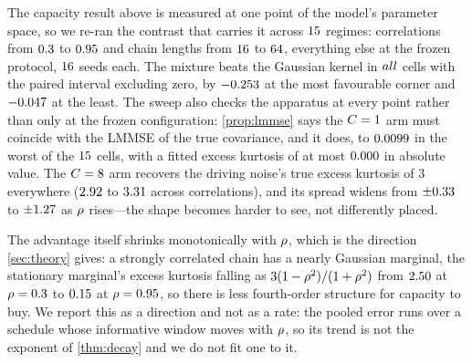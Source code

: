 The capacity result above is measured at one point of the model's parameter space, so we
re-ran the contrast that carries it across $15$ regimes: correlations from
$0.3$ to $0.95$ and chain lengths from $16$ to $64$, everything
else at the frozen protocol, $16$ seeds each. The mixture beats the Gaussian
kernel in $all$ cells with the paired interval excluding zero, by
$-0.253$ at the most favourable corner and $-0.047$ at the least.
The sweep also checks the apparatus at every point rather than only at the frozen
configuration: \cref{prop:lmmse} says the $C=1$ arm must coincide with the LMMSE of
the true covariance, and it does, to $0.0099$ in the worst of the $15$
cells, with a fitted excess kurtosis of at most $0.000$ in absolute value.
The $C=8$ arm recovers the driving noise's true excess kurtosis of $3$ everywhere
($2.92$ to $3.31$ across correlations), and its spread widens from
$\pm0.33$ to $\pm1.27$ as $\rho$ rises---the shape becomes harder
to see, not differently placed.

The advantage itself shrinks monotonically with $\rho$, which is the direction
\cref{sec:theory} gives: a strongly correlated chain has a nearly Gaussian marginal, the
stationary marginal's excess kurtosis falling as $3(1-\rho^2)/(1+\rho^2)$ from $2.50$ at
$\rho=0.3$ to $0.15$ at $\rho=0.95$, so there is less fourth-order
structure for capacity to buy. We report this as a direction and not as a rate: the
pooled error runs over a schedule whose informative window moves with $\rho$, so its
trend is not the exponent of \cref{thm:decay} and we do not fit one to it.
